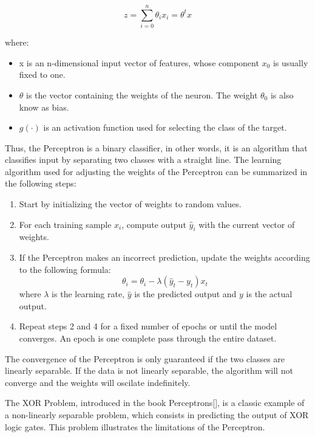 \documentclass[11pt,english,listoffigures,listoftables]{tfgetsinf}
\begin{document}
\begin{equation}
    z = \sum_{i=0}^n\theta_ix_i = \theta^{t}x
\end{equation}


where:
\begin{itemize}
    \item x is an n-dimensional input vector of features, whose component \( x_0 \) is usually fixed to one.
    \item \( \theta \) is the vector containing the weights of the neuron. The weight \( \theta_0 \) is also know as bias.
    \item $g(\cdot)$ is an activation function used for selecting the class of the target.
\end{itemize}

Thus, the Perceptron is a binary classifier, in other words, it is an algorithm that classifies input by separating two classes with a straight line. The learning algorithm used for adjusting the weights of the Perceptron can be summarized in the following steps:

\begin{enumerate}
    \item Start by initializing the vector of weights to random values.
    \item For each training sample \( x_i \), compute output \( \hat{y}_i \) with the current vector of weights.
    \item If the Perceptron makes an incorrect prediction, update the weights according to the following formula:
    \begin{equation}
        \theta_{i} = \theta_i - \lambda(\hat{y}_t-y_t)x_t
    \end{equation}
    where \( \lambda \) is the learning rate, \( \hat{y} \) is the predicted output and \( y \) is the actual output.
    \item Repeat steps 2 and 4 for a fixed number of epochs or until the model converges. An epoch is one complete pass through the entire dataset.

\end{enumerate}

The convergence of the Perceptron is only guaranteed if the two classes are linearly separable. If the data is not linearly separable, the algorithm will not converge and the weights will oscilate indefinitely.

The XOR Problem, introduced in the book Perceptrons[], is a classic example of a non-linearly separable problem, which consists in predicting the output of XOR logic gates. This problem illustrates the limitations of the Perceptron.
\end{document}
